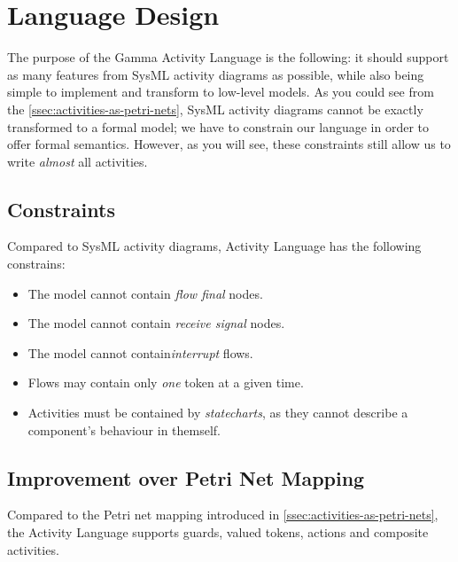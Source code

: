 \section{Language Design}

The purpose of the Gamma Activity Language is the following: it should support as many features from SysML activity diagrams as possible, while also being simple to implement and transform to low-level models.  As you could see from the \autoref{ssec:activities-as-petri-nets}, SysML activity diagrams cannot be exactly transformed to a formal model; we have to constrain our language in order to offer formal semantics. However, as you will see, these constraints still allow us to write \emph{almost} all activities.

\subsection{Constraints}

Compared to SysML activity diagrams, Activity Language has the following constrains:

\begin{itemize}
	\item The model cannot contain \emph{flow final} nodes.
	\item The model cannot contain \emph{receive signal} nodes.
	\item The model cannot contain\emph{interrupt} flows.
	\item Flows may contain only \emph{one} token at a given time.
	\item Activities must be contained by \emph{statecharts}, as they cannot describe a component's behaviour in themself.
\end{itemize}

\subsection{Improvement over Petri Net Mapping}

Compared to the Petri net mapping introduced in \autoref{ssec:activities-as-petri-nets}, the Activity Language supports guards, valued tokens, actions and composite activities.

